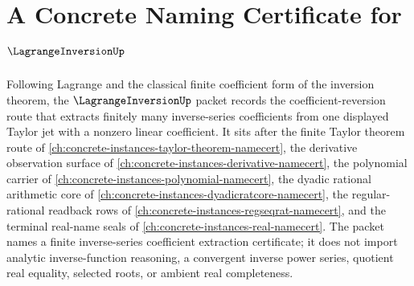 \chapter{A Concrete Naming Certificate for $\LagrangeInversionUp$}
\label{ch:concrete-instances-lagrange-inversion-namecert}

Following Lagrange and the classical finite coefficient form of the inversion theorem, the $\LagrangeInversionUp$ packet records the coefficient-reversion route that extracts finitely many inverse-series coefficients from one displayed Taylor jet with a nonzero linear coefficient. It sits after the finite Taylor theorem route of \autoref{ch:concrete-instances-taylor-theorem-namecert}, the derivative observation surface of \autoref{ch:concrete-instances-derivative-namecert}, the polynomial carrier of \autoref{ch:concrete-instances-polynomial-namecert}, the dyadic rational arithmetic core of \autoref{ch:concrete-instances-dyadicratcore-namecert}, the regular-rational readback rows of \autoref{ch:concrete-instances-regseqrat-namecert}, and the terminal real-name seals of \autoref{ch:concrete-instances-real-namecert}. The packet names a finite inverse-series coefficient extraction certificate; it does not import analytic inverse-function reasoning, a convergent inverse power series, quotient real equality, selected roots, or ambient real completeness.

